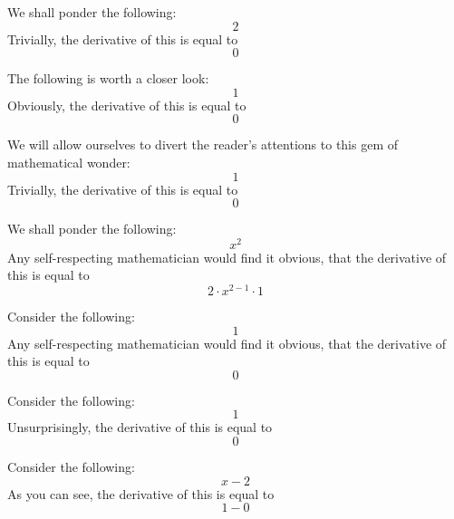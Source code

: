 \documentclass{article}
\begin{document}
We shall ponder the following:
\begin{equation}
2 
\end{equation}
Trivially, the derivative of this is equal to
\begin{equation}
0 
\end{equation}

The following is worth a closer look:
\begin{equation}
1 
\end{equation}
Obviously, the derivative of this is equal to
\begin{equation}
0 
\end{equation}

We will allow ourselves to divert the reader's attentions to this gem of mathematical wonder:
\begin{equation}
1 
\end{equation}
Trivially, the derivative of this is equal to
\begin{equation}
0 
\end{equation}

We shall ponder the following:
\begin{equation}
x ^{2 } 
\end{equation}
Any self-respecting mathematician would find it obvious, that the derivative of this is equal to
\begin{equation}
2 \cdot x ^{2 - 1 } \cdot 1 
\end{equation}

Consider the following:
\begin{equation}
1 
\end{equation}
Any self-respecting mathematician would find it obvious, that the derivative of this is equal to
\begin{equation}
0 
\end{equation}

Consider the following:
\begin{equation}
1 
\end{equation}
Unsurprisingly, the derivative of this is equal to
\begin{equation}
0 
\end{equation}

Consider the following:
\begin{equation}
x - 2 
\end{equation}
As you can see, the derivative of this is equal to
\begin{equation}
1 - 0 
\end{equation}
\end{document}
